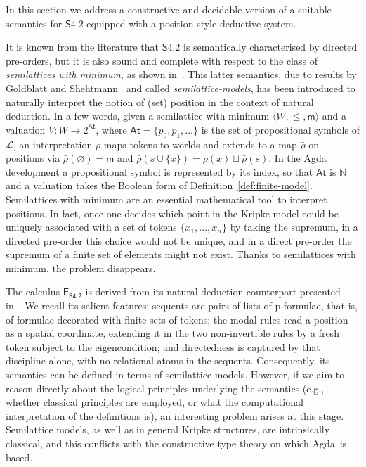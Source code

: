 \documentclass{article}
\newcommand{\logic}{\mathsf{S4.2}}
\newcommand{\eseq}{\mathsf{E}_{{\textsf{S4.2}}}}
\newcommand{\agda}{\textsf{Agda}}
\theoremstyle{definition}
\begin{document}
In this section we address a constructive and decidable version of a suitable semantics for $\logic$ equipped with a position-style deductive system.

It is known from the literature that $\logic$ is semantically characterised by directed pre-orders, but it is also sound and complete with respect to the class of \emph{semilattices with minimum}, as shown in~\cite[Theorem~21]{Martini2024:S42NaturalDeduction}. This latter semantics, due to results by Goldblatt and Shehtmann~\cite{Goldblatt1980:Diodorean, Shehtman1983:ModalDomains} and called \emph{semilattice-models}, has been introduced to naturally interpret the notion of (set) position in the context of natural deduction.
In a few words, given a semilattice with minimum $\langle W, \leq, \mathsf{m} \rangle$ and a valuation $V : W \to 2^{\mathsf{At}}$, where $\mathsf{At} = \{p_0, p_1, \ldots\}$ is the set of propositional symbols of $\mathcal{L}$, an interpretation $\rho$ maps tokens to worlds and extends to a map $\bar{\rho}$ on positions via $\bar{\rho}(\varnothing) = \mathsf{m}$ and $\bar{\rho}(s \cup \{x\}) = \rho(x) \sqcup \bar{\rho}(s)$. In the \agda{} development a propositional symbol is represented by its index, so that $\mathsf{At}$ is $\mathbb{N}$ and a valuation takes the Boolean form of Definition~\ref{def:finite-model}. Semilattices with minimum are an essential mathematical tool to interpret positions. In fact, once one decides which point in the Kripke model could be uniquely associated with a set of tokens $\{x_1,\ldots,x_n\}$ by taking the supremum,
in a directed pre-order this choice would not be unique, and in a direct pre-order the supremum of a finite set of elements might not exist. Thanks to semilattices with minimum, the problem disappears.

The calculus $\eseq$ is derived from its natural-deduction counterpart presented in~\cite{Martini2024:S42NaturalDeduction}. We recall its salient features: sequents are pairs of lists of p-formulae, that is, of formulae decorated with finite sets of tokens; the modal rules read a position as a spatial coordinate, extending it in the two non-invertible rules by a fresh token subject to the eigencondition; and directedness is captured by that discipline alone, with no relational atoms in the sequents. Consequently, its semantics can be defined in terms of semilattice models. However, if we aim to reason directly about the logical principles underlying the semantics (e.g., whether classical principles are employed, or what the computational interpretation of the definitions is), an interesting problem arises at this stage. Semilattice models, as well as in general Kripke structures, are intrinsically classical, and this conflicts with the constructive type theory on which \agda\ is based.
\end{document}
